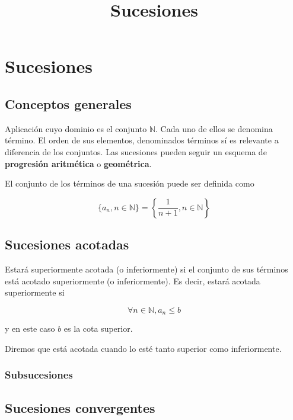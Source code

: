 

\title{Sucesiones}



\maketitle
\tableofcontents

\chapter{Sucesiones}


\section{Conceptos generales}
Aplicación cuyo dominio es el conjunto $\mathbb{N}$. Cada uno de ellos se denomina término. El orden
de sus elementos, denominados términos sí es relevante a diferencia de los conjuntos. Las sucesiones
pueden seguir un esquema de \textbf{progresión aritmética} o \textbf{geométrica}.

El conjunto de los términos de una sucesión puede ser definida como

$$\{a_n, n\in \mathbb{N}\}=\left\{\frac{1}{n+1}, n\in\mathbb{N}\right\}$$

\section{Sucesiones acotadas}

Estará superiormente acotada (o inferiormente) si el conjunto de sus términos está acotado
superiormente (o inferiormente). Es decir, estará acotada superiormente si

$$\forall n\in\mathbb{N}, a_n \leq b$$

y en este caso $b$ es la cota superior.

Diremos que está acotada cuando lo esté tanto superior como inferiormente.

\subsection{Subsucesiones}

\section{Sucesiones convergentes}\label{sec_sucesiones_convergentes}

